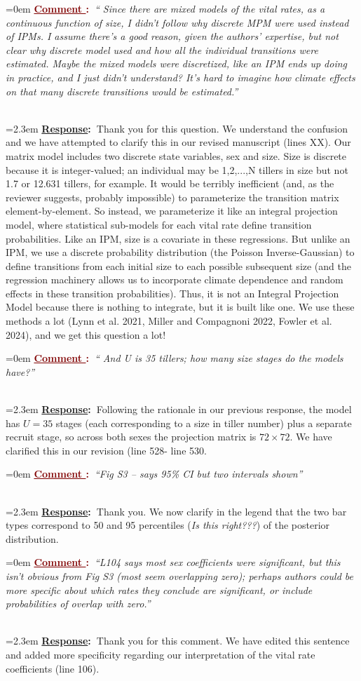 \documentclass[12pt]{article}
\newcounter{cN}
\newcommand{\comment}[1]{
	\vspace{2em}
	\refstepcounter{cN} %
	\noindent \hangindent=0em \textbf{\textcolor{Maroon}{\uline{Comment \thecN}:~}}\emph{``#1''}
	}
\newcommand{\response}[1]{
	\\[0.25em]
	\hangindent=2.3em \textbf{\textcolor{NavyBlue}{\uline{Response}:~}}#1
	}
\begin{document}
\comment{ Since there are mixed models of the vital rates, as a continuous function of size, I didn’t follow why discrete MPM were used instead of IPMs. I assume there’s a good reason, given the authors’ expertise, but not clear why discrete model used and how all the individual transitions were estimated. Maybe the mixed models were discretized, like an IPM ends up doing in practice, and I just didn’t understand? It’s hard to imagine how climate effects on that many discrete transitions would be estimated.}
\response{Thank you for this question. We understand the confusion and we have attempted to clarify this in our revised manuscript (lines XX).
Our matrix model includes two discrete state variables, sex and size. 
Size is discrete because it is integer-valued; an individual may be 1,2,...,N tillers in size but not 1.7 or 12.631 tillers, for example. 
It would be terribly inefficient (and, as the reviewer suggests, probably impossible) to parameterize the transition matrix element-by-element. 
So instead, we parameterize it like an integral projection model, where statistical sub-models for each vital rate define transition probabilities. 
Like an IPM, size is a covariate in these regressions. 
But unlike an IPM, we use a discrete probability distribution (the Poisson Inverse-Gaussian) to define transitions from each initial size to each possible subsequent size (and the regression machinery allows us to incorporate climate dependence and random effects in these transition probabilities). 
Thus, it is not an Integral Projection Model because there is nothing to integrate, but it is built like one. 
We use these methods a lot (Lynn et al. 2021, Miller and Compagnoni 2022, Fowler et al. 2024), and we get this question a lot!
}

\comment{ And U is 35 tillers; how many size stages do the models have?}
\response{Following the rationale in our previous response, the model has $U=35$ stages (each corresponding to a size in tiller number) plus a separate recruit stage, so across both sexes the projection matrix is $72 \times 72$. We have clarified this in our revision (line 528- line 530.}

\comment{Fig S3 – says 95\% CI but two intervals shown}
\response{Thank you. We now clarify in the legend that the two bar types correspond to 50 and 95 percentiles (\textit{Is this right???}) of the posterior distribution.}

\comment{L104 says most sex coefficients were significant, but this isn’t obvious from Fig S3 (most seem overlapping zero); perhaps authors could be more specific about which rates they conclude are significant, or include probabilities of overlap with zero.}
\response{Thank you for  this comment.
We have edited this sentence and added more specificity regarding our interpretation of the vital rate coefficients (line 106).}
\end{document}
